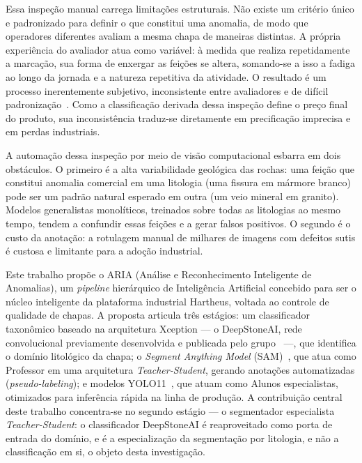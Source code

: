 \documentclass[12pt]{article}
\begin{document}
Essa inspeção manual carrega limitações estruturais. Não existe um critério único e padronizado para definir o que constitui uma anomalia, de modo que operadores diferentes avaliam a mesma chapa de maneiras distintas. A própria experiência do avaliador atua como variável: à medida que realiza repetidamente a marcação, sua forma de enxergar as feições se altera, somando-se a isso a fadiga ao longo da jornada e a natureza repetitiva da atividade. O resultado é um processo inerentemente subjetivo, inconsistente entre avaliadores e de difícil padronização~\cite{stone_subjectivity_castro2018}. Como a classificação derivada dessa inspeção define o preço final do produto, sua inconsistência traduz-se diretamente em precificação imprecisa e em perdas industriais.

A automação dessa inspeção por meio de visão computacional esbarra em dois obstáculos. O primeiro é a alta variabilidade geológica das rochas: uma feição que constitui anomalia comercial em uma litologia (uma fissura em mármore branco) pode ser um padrão natural esperado em outra (um veio mineral em granito). Modelos generalistas monolíticos, treinados sobre todas as litologias ao mesmo tempo, tendem a confundir essas feições e a gerar falsos positivos. O segundo é o custo da anotação: a rotulagem manual de milhares de imagens com defeitos sutis é custosa e limitante para a adoção industrial.

Este trabalho propõe o ARIA (Análise e Reconhecimento Inteligente de Anomalias), um \textit{pipeline} hierárquico de Inteligência Artificial concebido para ser o núcleo inteligente da plataforma industrial Hartheus, voltada ao controle de qualidade de chapas. A proposta articula três estágios: um classificador taxonômico baseado na arquitetura Xception --- o DeepStoneAI, rede convolucional previamente desenvolvida e publicada pelo grupo~\cite{deepstoneai_moreira2025} ---, que identifica o domínio litológico da chapa; o \textit{Segment Anything Model} (SAM)~\cite{sam_kirillov2023}, que atua como Professor em uma arquitetura \textit{Teacher-Student}, gerando anotações automatizadas (\textit{pseudo-labeling}); e modelos YOLO11~\cite{yolo11_khanam2024}, que atuam como Alunos especialistas, otimizados para inferência rápida na linha de produção. A contribuição central deste trabalho concentra-se no segundo estágio --- o segmentador especialista \textit{Teacher-Student}: o classificador DeepStoneAI é reaproveitado como porta de entrada do domínio, e é a especialização da segmentação por litologia, e não a classificação em si, o objeto desta investigação.
\end{document}
